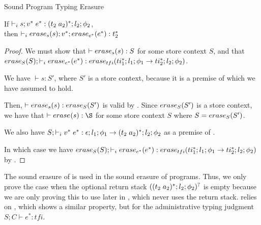 \begin{theorem}{Sound Program Typing Erasure}
    \label{thm:programerasure}

    If $\vdash_i s;v^{*}\;e^{*} : \ti{t_2}{a_2}^{*};l_2;\phi_2$,
    \\ then $\vdash_i \erase[s]{s};v^{*};\erase[e^{*}]{e^{*}} : t_2^{*}$
\end{theorem}
\begin{proof}

    We must show that $\vdash \erase[s]{s} : S$ for some \wasm store context $S$, and that $\erase[S]{S};\empty \vdash_i \erase[e^{*}]{e^{*}} : \erase[tfi]{ti_1^{*};l_1;\phi_1 \rightarrow ti_2^{*};l_2;\phi_2}$.

    We have $\vdash s : S'$, where $S'$ is a \name store context, because it is a premise of  which we have assumed to hold.

    Then, $\vdash \erase[s]{s} : \erase[S]{S'}$ is valid by .
    Since $\erase[S]{S'}$ is a \wasm store context, we have that $\vdash \erase{s} : \S$ for some \wasm store context $S$ where $S=\erase[S]{S'}$.

    We also have $S;\empty \vdash_i v^{*}\;e^{*} : \epsilon;l_1;\phi_1 \rightarrow \ti{t_2}{a_2}^{*};l_2;\phi_2$ as a premise of .

    In which case we have $\erase[S]{S};\empty \vdash_i \erase[e^{*}]{e^{*}} : \erase[tfi]{ti_1^{*};l_1;\phi_1 \rightarrow ti_2^{*};l_2;\phi_2}$ by .
\end{proof}

The sound erasure of  is used in the sound erasure of programs.
Thus, we only prove the case when the optional return stack $(\ti{t_2}{a_2}^{*};l_2;\phi_2)^{?}$ is empty because we are only proving this to use later in , which never uses the return stack.
 relies on , which shows a similar property, but for the administrative typing judgment $S;C \vdash e^{*} : tfi$.

